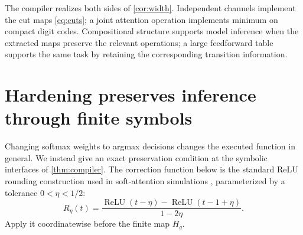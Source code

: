 \documentclass{article}
\theoremstyle{definition}
\newcommand{\relu}{\operatorname{ReLU}}
\begin{document}
The compiler realizes both sides of \cref{cor:width}. Independent channels implement the cut maps \eqref{eq:cuts}; a joint attention operation implements minimum on compact digit codes. Compositional structure supports model inference when the extracted maps preserve the relevant operations; a large feedforward table supports the same task by retaining the corresponding transition information.

\section{Hardening preserves inference through finite symbols}\label{sec:hardening}
Changing softmax weights to argmax decisions changes the executed function in general. We instead give an exact preservation condition at the symbolic interfaces of \cref{thm:compiler}. The correction function below is the standard ReLU rounding construction used in soft-attention simulations \citep{yang2026soft}, parameterized by a tolerance $0<\eta<1/2$:
\begin{equation}
 R_\eta(t)=\frac{\relu(t-\eta)-\relu(t-1+\eta)}{1-2\eta}.
 \label{eq:round}
\end{equation}
Apply it coordinatewise before the finite map $H_g$.
\end{document}
